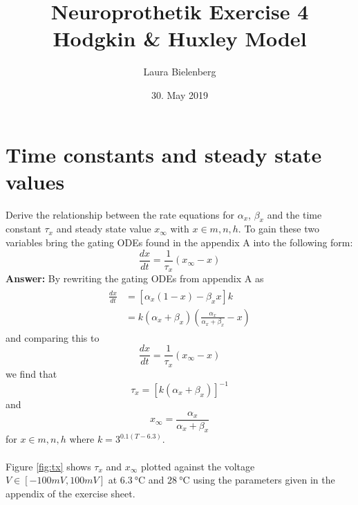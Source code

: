 \documentclass{scrartcl}			%
\title{Neuroprothetik Exercise 4 \\ Hodgkin \& Huxley Model}
\author{ Laura Bielenberg }
\date{30. May 2019}
\begin{document}

\maketitle
\section{Time constants and steady state values}
Derive the relationship between the rate equations for $\alpha_x$, $\beta_x$ and the time constant $\tau_x$ and steady state value $x_\infty$ with $x \in{m,n,h}$. To gain these two variables bring the gating ODEs found in the appendix A into the following form:
\begin{equation}
\frac{dx}{dt}= \frac{1}{\tau_x}(x_\infty - x)
\end{equation}
\newline
\newline
\textbf{Answer:}
\newline
By rewriting the gating ODEs from appendix A as
\begin{align}
\begin{split}
\frac{dx}{dt} &= [\alpha_x(1-x)-\beta_x x]k\\ &= k(\alpha_x+\beta_x)(\frac{\alpha_x}{\alpha_x+\beta_x}-x)
\end{split}
\end{align}
and comparing this to 
\begin{equation}\label{eq:x_dt}
\frac{dx}{dt} = \frac{1}{\tau_x}(x_\infty-x)
\end{equation}
we find that
\begin{equation}\label{eq:Tau}
\tau_x = [k(\alpha_x + \beta_x)]^{-1}
\end{equation}
and
\begin{equation}\label{eq:x_inf}
x_\infty = \frac{\alpha_x}{\alpha_x+\beta_x}
\end{equation}
for $x \in {m,n,h}$ where $k=3^{0.1(T-6.3)}$.\\
\\
Figure \ref{fig:tx} shows  $\tau_x$  and $x_\infty$ plotted against the voltage $V\in[-100 mV, 100 mV]$ at $\SI{6.3}{\celsius}$ and $\SI{28}{\celsius}$ using the parameters given in the appendix of the exercise sheet.
\newpage
\end{document}
